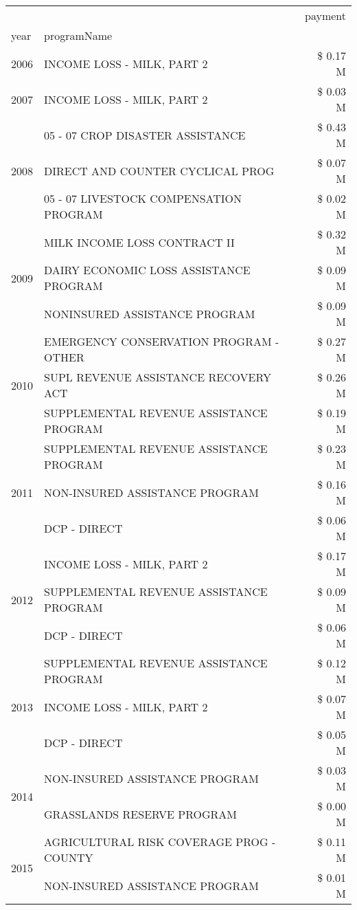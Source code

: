\begin{tabular}{llr}
\toprule
 &  & payment \\
year & programName &  \\
\midrule
2006 & INCOME LOSS - MILK, PART 2 & \$ 0.17 M \\
\cline{1-3}
2007 & INCOME LOSS - MILK, PART 2 & \$ 0.03 M \\
\cline{1-3}
\multirow[t]{3}{*}{2008} & 05 - 07 CROP DISASTER ASSISTANCE & \$ 0.43 M \\
 & DIRECT AND COUNTER CYCLICAL PROG & \$ 0.07 M \\
 & 05 - 07 LIVESTOCK COMPENSATION PROGRAM & \$ 0.02 M \\
\cline{1-3}
\multirow[t]{3}{*}{2009} & MILK INCOME LOSS CONTRACT II & \$ 0.32 M \\
 & DAIRY ECONOMIC LOSS ASSISTANCE PROGRAM & \$ 0.09 M \\
 & NONINSURED ASSISTANCE PROGRAM & \$ 0.09 M \\
\cline{1-3}
\multirow[t]{3}{*}{2010} & EMERGENCY CONSERVATION PROGRAM - OTHER & \$ 0.27 M \\
 & SUPL REVENUE ASSISTANCE RECOVERY ACT & \$ 0.26 M \\
 & SUPPLEMENTAL REVENUE ASSISTANCE PROGRAM & \$ 0.19 M \\
\cline{1-3}
\multirow[t]{3}{*}{2011} & SUPPLEMENTAL REVENUE ASSISTANCE PROGRAM & \$ 0.23 M \\
 & NON-INSURED ASSISTANCE PROGRAM & \$ 0.16 M \\
 & DCP - DIRECT & \$ 0.06 M \\
\cline{1-3}
\multirow[t]{3}{*}{2012} & INCOME LOSS - MILK, PART 2 & \$ 0.17 M \\
 & SUPPLEMENTAL REVENUE ASSISTANCE PROGRAM & \$ 0.09 M \\
 & DCP - DIRECT & \$ 0.06 M \\
\cline{1-3}
\multirow[t]{3}{*}{2013} & SUPPLEMENTAL REVENUE ASSISTANCE PROGRAM & \$ 0.12 M \\
 & INCOME LOSS - MILK, PART 2 & \$ 0.07 M \\
 & DCP - DIRECT & \$ 0.05 M \\
\cline{1-3}
\multirow[t]{2}{*}{2014} & NON-INSURED ASSISTANCE PROGRAM & \$ 0.03 M \\
 & GRASSLANDS RESERVE PROGRAM & \$ 0.00 M \\
\cline{1-3}
\multirow[t]{3}{*}{2015} & AGRICULTURAL RISK COVERAGE PROG - COUNTY & \$ 0.11 M \\
 & NON-INSURED ASSISTANCE PROGRAM & \$ 0.01 M \\

\end{tabular}
